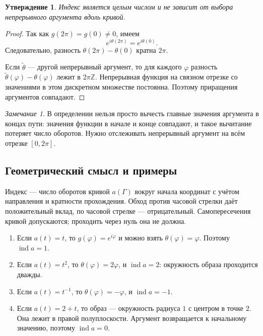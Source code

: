 \documentclass[12pt,a4paper]{article}
\newtheorem{proposition}{Утверждение}
\theoremstyle{definition}
\theoremstyle{remark}
\newtheorem*{remark}{Замечание}
\newcommand{\ZZ}{\mathbb{Z}}
\DeclareMathOperator{\ind}{ind}
\begin{document}
\begin{proposition}
Индекс является целым числом и не зависит от выбора непрерывного
аргумента вдоль кривой.
\end{proposition}

\begin{proof}
Так как $g(2\pi)=g(0)\ne0$, имеем
\[
  e^{i\theta(2\pi)}=e^{i\theta(0)}.
\]
Следовательно, разность $\theta(2\pi)-\theta(0)$ кратна $2\pi$.

Если $\widetilde\theta$ --- другой непрерывный аргумент, то для каждого
$\varphi$ разность $\widetilde\theta(\varphi)-\theta(\varphi)$ лежит
в $2\pi\ZZ$. Непрерывная функция на связном отрезке со значениями
в этом дискретном множестве постоянна. Поэтому приращения аргументов
совпадают.
\end{proof}

\begin{remark}
В определении нельзя просто вычесть главные значения аргумента в
концах пути: значения функции в начале и конце совпадают, и такое
вычитание потеряет число оборотов. Нужно отслеживать непрерывный
аргумент на всём отрезке $[0,2\pi]$.
\end{remark}

\subsection{Геометрический смысл и примеры}

Индекс --- число оборотов кривой $a(\Gamma)$ вокруг начала координат
с учётом направления и кратности прохождения. Обход против часовой
стрелки даёт положительный вклад, по часовой стрелке --- отрицательный.
Самопересечения кривой допускаются; проходить через нуль она не должна.

\begin{enumerate}
  \item Если $a(t)=t$, то $g(\varphi)=e^{i\varphi}$ и можно взять
        $\theta(\varphi)=\varphi$. Поэтому $\ind a=1$.
  \item Если $a(t)=t^2$, то $\theta(\varphi)=2\varphi$,
        и $\ind a=2$: окружность образа проходится дважды.
  \item Если $a(t)=t^{-1}$, то $\theta(\varphi)=-\varphi$,
        и $\ind a=-1$.
  \item Если $a(t)=2+t$, то образ --- окружность радиуса $1$
        с центром в точке $2$. Она лежит в правой полуплоскости.
        Аргумент возвращается к начальному значению, поэтому $\ind a=0$.
\end{enumerate}
\end{document}
